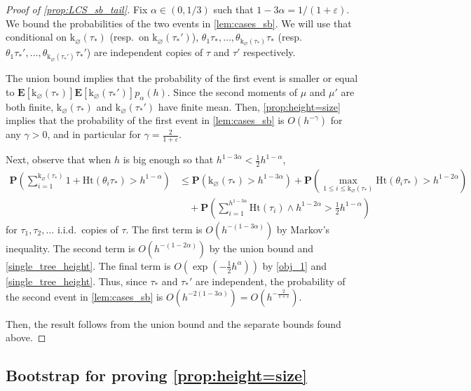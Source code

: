 \documentclass[11pt,reqno]{amsart}
\newcommand{\1}{\mathbf{1}}
\newcommand{\0}{\mathbf{0}}
\newcommand{\E}{{\mathbf E}}
\newcommand{\prob}{\mathbf{P}}
\newcommand{\Ht}{\mathrm{Ht}}
\newcommand{\rk}{\mathrm{k}}
\newcommand{\eps}{\varepsilon}
\begin{document}
\begin{proof}[Proof of \cref{prop:LCS_sb_tail}]
Fix $\alpha\in (0,1/3)$ such that $1-3\alpha=1/(1+\eps)$. We bound the probabilities of the two events in \cref{lem:cases_sb}. We will use that conditional on $\rk_\varnothing(\tau_*)$ (resp.~on $\rk_\varnothing(\tau_*')$), $\theta_1\tau_*,\dots, \theta_{\rk_\varnothing(\tau_*)}\tau_*$ (resp.~$\theta_1\tau_*',\dots, \theta_{\rk_\varnothing(\tau_*')}\tau_*'$) are independent copies of $\tau$ and $\tau'$ respectively.

The union bound implies that the probability of the first event is smaller or equal to $\E[\rk_\varnothing(\tau_*)]\E[\rk_\varnothing(\tau_*')]p_\alpha(h)$. Since the second moments of $\mu$ and $\mu'$ are both finite, $\rk_\varnothing(\tau_*)$ and $\rk_\varnothing(\tau_*')$ have finite mean. Then, \cref{prop:height=size} implies that the probability of the first event in \cref{lem:cases_sb} is $O(h^{-\gamma})$ for any $\gamma>0$, and in particular for $\gamma=\tfrac{2}{1+\varepsilon}$.

Next, observe that when $h$ is big enough so that $h^{1-3\alpha}<\tfrac{1}{2}h^{1-\alpha}$,
\begin{align*}\prob\left(\sum_{i=1}^{\rk_\varnothing(\tau_*)}1+\Ht(\theta_i\tau_*)>h^{1-\alpha}\right)&\le \prob(\rk_\varnothing(\tau_*)>h^{1-3\alpha})+\prob\left(\max_{1\le i \le \rk_\varnothing(\tau_*)}\Ht(\theta_i\tau_*)>h^{1-2\alpha}\right)\\
&\quad +\prob\left(\sum_{i=1}^{h^{1-3\alpha}}\Ht(\tau_i)\wedge h^{1-2\alpha} >\tfrac{1}{2} h^{1-\alpha}\right)
\end{align*}
for $\tau_1,\tau_2,\dots$ i.i.d.\ copies of $\tau$.
The first term is $O(h^{-(1-3\alpha)})$ by Markov's inequality. The second term is $O(h^{-(1-2\alpha)})$ by the union bound and \cref{single_tree_height}. The final term is $O(\exp(-\tfrac{1}{2}h^\alpha))$ by \cref{obj_1} and \cref{single_tree_height}. Thus, since $\tau_*$ and $\tau_*'$ are independent, the probability of the second event in \cref{lem:cases_sb} is $O(h^{-2(1-3\alpha)})=O(h^{-\frac{2}{1+\varepsilon}})$. 

Then, the result follows from the union bound and the separate bounds found above. 
\end{proof}



\subsection{Bootstrap for proving \cref{prop:height=size}}
\end{document}
